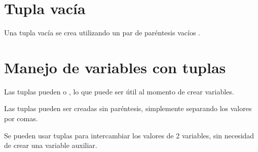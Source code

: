 \section{Tupla vacía}

Una tupla vacía se crea utilizando un par de paréntesis vacíos \ttt{()}.


\section{Manejo de variables con tuplas}

Las tuplas pueden  o , lo que puede ser útil al momento de crear variables.


Las tuplas pueden ser creadas sin paréntesis, simplemente separando los valores por comas.


Se pueden usar tuplas para intercambiar los valores de 2 variables, sin necesidad de crear una variable auxiliar.


\clearpage